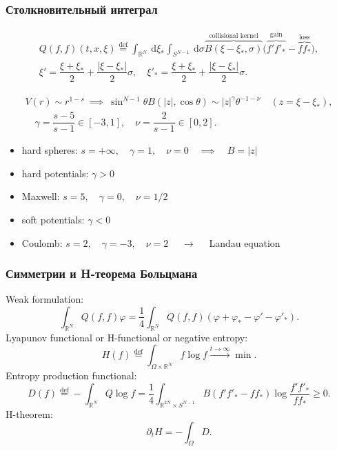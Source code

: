 \documentclass[mathserif]{beamer} %
\newcommand{\eqdef}{\overset{\mathrm{def}}{=}}
\newcommand{\dd}{\:\mathrm{d}}
\newcommand{\pder}[2][]{\partial_{#2}{#1}}
\newcommand{\dxi}{\dd\xi}
\begin{document}
\begin{frame}
    \frametitle{Столкновительный интеграл}
    \begin{gather*}
        Q(f,f)(t,x,\xi) \eqdef \int_{\mathbb{R}^N}\dxi_* \int_{S^{N-1}} \dd\sigma
        \overbrace{B(\xi-\xi_*,\sigma)}^\text{collisional kernel}
        \Big( \overbrace{f'f'_*}^\text{gain} - \overbrace{ff_*}^\text{loss} \Big), \\
        \xi' = \dfrac{\xi+\xi_*}2 + \dfrac{|\xi-\xi_*|}2\sigma, \quad
        \xi'_* = \dfrac{\xi+\xi_*}2 + \dfrac{|\xi-\xi_*|}2\sigma.
    \end{gather*}

    \pause
    \begin{gather*}
        V(r)\sim r^{1-s} \:\implies\: \sin^{N-1}\theta B(|z|,\cos\theta) \sim |z|^\gamma \theta^{-1-\nu} \quad(z=\xi-\xi_*), \\
        \quad \gamma = \dfrac{s-5}{s-1}\in[-3,1], \quad \nu = \dfrac2{s-1}\in[0,2].
    \end{gather*}
    \vspace{-20pt}
    \begin{itemize}
        \item hard spheres: \(s=+\infty,\quad\gamma=1,\quad\nu=0 \quad\implies\quad B=|z|\)
        \item hard potentials: \(\gamma>0\)
        \item Maxwell: \(s=5,\quad\gamma=0,\quad\nu=1/2\)
        \item soft potentials: \(\gamma<0\)
        \item Coulomb: \(s=2,\quad\gamma=-3,\quad\nu=2\) \(\quad\longrightarrow\quad\) Landau equation
    \end{itemize}

\end{frame}

\begin{frame}
    \frametitle{Симметрии и H-теорема Больцмана}
    Weak formulation:
    \begin{equation*}
        \int_{\mathbb{R}^N} Q(f,f)\varphi = \frac14 \int_{\mathbb{R}^N} Q(f,f) (\varphi + \varphi_* - \varphi' - \varphi'_*).
    \end{equation*}
    \pause
    Lyapunov functional or H-functional or negative entropy:
    \begin{equation*}
        H(f) \eqdef \int_{\Omega\times\mathbb{R}^N} f\log{f} \xrightarrow{t\to\infty} \min.
    \end{equation*}
    Entropy production functional:
    \begin{equation*}
        D(f) \eqdef -\int_{\mathbb{R}^N} Q\log{f} = \frac14\int_{\mathbb{R}^{2N}\times S^{N-1}}
        B\left( f'f'_* - ff_* \right) \log\frac{f'f'_*}{ff_*} \geq 0.
    \end{equation*}
    H-theorem:
    \begin{equation*}
        \pder[H]{t} = - \int_\Omega D.
    \end{equation*}
\end{frame}
\end{document}
